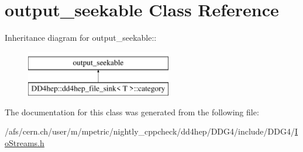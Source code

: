 \hypertarget{classboost_1_1iostreams_1_1output__seekable}{
\section{output\_\-seekable Class Reference}
\label{classboost_1_1iostreams_1_1output__seekable}
}
Inheritance diagram for output\_\-seekable::\begin{figure}[H]
\begin{center}
\leavevmode
\includegraphics[height=2cm]{classboost_1_1iostreams_1_1output__seekable}
\end{center}
\end{figure}


The documentation for this class was generated from the following file:\begin{DoxyCompactItemize}
\item 
/afs/cern.ch/user/m/mpetric/nightly\_\-cppcheck/dd4hep/DDG4/include/DDG4/\hyperlink{_io_streams_8h}{IoStreams.h}\end{DoxyCompactItemize}
